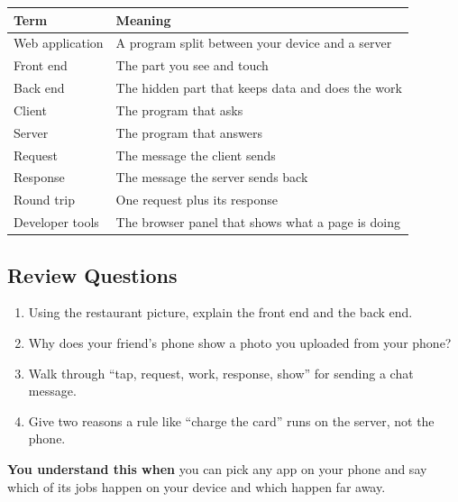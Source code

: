{\def\LTcaptype{none} %
\begin{longtable}[]{@{}ll@{}}
\toprule\noalign{}
Term & Meaning \\
\midrule\noalign{}
\endhead
\bottomrule\noalign{}
\endlastfoot
Web application & A program split between your device and a server \\
Front end & The part you see and touch \\
Back end & The hidden part that keeps data and does the work \\
Client & The program that asks \\
Server & The program that answers \\
Request & The message the client sends \\
Response & The message the server sends back \\
Round trip & One request plus its response \\
Developer tools & The browser panel that shows what a page is doing \\
\end{longtable}
}

\subsection*{Review Questions}\label{webapp-01:review-questions}

\begin{enumerate}
\def\labelenumi{\arabic{enumi}.}
\tightlist
\item
  Using the restaurant picture, explain the front end and the back end.
\item
  Why does your friend's phone show a photo you uploaded from your phone?
\item
  Walk through ``tap, request, work, response, show'' for sending a chat message.
\item
  Give two reasons a rule like ``charge the card'' runs on the server, not the phone.
\end{enumerate}

\begin{notebox}

\textbf{You understand this when} you can pick any app on your phone and say which of its jobs happen on your device and which happen far away.

\end{notebox}
